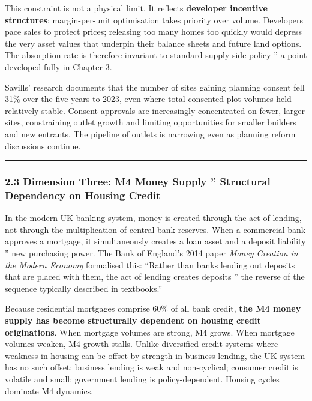 \documentclass[
]{article}
\begin{document}
This constraint is not a physical limit. It reflects \textbf{developer
incentive structures}: margin-per-unit optimisation takes priority over
volume. Developers pace sales to protect prices; releasing too many
homes too quickly would depress the very asset values that underpin
their balance sheets and future land options. The absorption rate is
therefore invariant to standard supply-side policy '' a point developed
fully in Chapter 3.

Savills' research documents that the number of sites gaining planning
consent fell 31\% over the five years to 2023, even where total
consented plot volumes held relatively stable. Consent approvals are
increasingly concentrated on fewer, larger sites, constraining outlet
growth and limiting opportunities for smaller builders and new entrants.
The pipeline of outlets is narrowing even as planning reform discussions
continue.

\begin{center}\rule{0.5\linewidth}{0.5pt}\end{center}

\subsubsection{2.3 Dimension Three: M4 Money Supply '' Structural
Dependency on Housing
Credit}\label{dimension-three-m4-money-supply-structural-dependency-on-housing-credit}

In the modern UK banking system, money is created through the act of
lending, not through the multiplication of central bank reserves. When a
commercial bank approves a mortgage, it simultaneously creates a loan
asset and a deposit liability '' new purchasing power. The Bank of
England's 2014 paper \emph{Money Creation in the Modern Economy}
formalised this: ``Rather than banks lending out deposits that are
placed with them, the act of lending creates deposits '' the reverse of
the sequence typically described in textbooks.''

Because residential mortgages comprise 60\% of all bank credit,
\textbf{the M4 money supply has become structurally dependent on housing
credit originations}. When mortgage volumes are strong, M4 grows. When
mortgage volumes weaken, M4 growth stalls. Unlike diversified credit
systems where weakness in housing can be offset by strength in business
lending, the UK system has no such offset: business lending is weak and
non-cyclical; consumer credit is volatile and small; government lending
is policy-dependent. Housing cycles dominate M4 dynamics.
\end{document}
